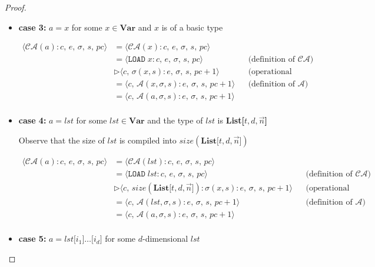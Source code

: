 \documentclass{article}
\begin{document}
\begin{proof}
\begin{itemize}
    \item \textbf{case 3: } $a = x$ for some $x \in \textbf{Var}$ and $x$ is of a basic type

    \[
      \begin{aligned}
        \langle  \mathcal{CA}(a) : c,\, e,\, \sigma,\, s,\, pc \rangle 
        &= \langle \mathcal{CA}(x) : c,\, e,\, \sigma,\, s,\, pc \rangle \\
        &= \langle \texttt{LOAD}\;x : c,\, e,\, \sigma,\, s,\, pc \rangle 
        && \text{(definition of $\mathcal{CA}$)} \\
        &\triangleright \langle c,\, \sigma(x, s) : e,\, \sigma,\, s,\, pc+1 \rangle 
        && \text{(operational semantics)} \\
        &= \langle c,\, \mathcal{A}(x, \sigma, s) : e,\, \sigma,\, s,\, pc+1 \rangle 
        && \text{(definition of $\mathcal{A}$)} \\
        &= \langle c,\, \mathcal{A}(a, \sigma, s) : e,\, \sigma,\, s,\, pc+1 \rangle \\
      \end{aligned}
  \]

  \item \textbf{case 4: } $a = lst$ for some $lst \in \textbf{Var}$ and the type of $lst$ is \textbf{List[$t, d, \vec{n}$]}

    Observe that the size of $lst$ is compiled into $size(\textbf{List[$t, d, \vec{n}$]})$

  \[
      \begin{aligned}
        \langle  \mathcal{CA}(a) : c,\, e,\, \sigma,\, s,\, pc \rangle 
        &= \langle \mathcal{CA}(lst) : c,\, e,\, \sigma,\, s,\, pc \rangle \\
        &= \langle \texttt{LOAD}\;lst : c,\, e,\, \sigma,\, s,\, pc \rangle 
        && \text{(definition of $\mathcal{CA}$)} \\
        &\triangleright \langle c,\, size(\textbf{List[$t, d, \vec{n}$]}) : \sigma(x, s) : e,\, \sigma,\, s,\, pc+1 \rangle 
        && \text{(operational semantics)} \\
        &= \langle c,\, \mathcal{A}(lst, \sigma, s) : e,\, \sigma,\, s,\, pc+1 \rangle 
        && \text{(definition of $\mathcal{A}$)} \\
        &= \langle c,\, \mathcal{A}(a, \sigma, s) : e,\, \sigma,\, s,\, pc+1 \rangle \\
      \end{aligned}
  \]

  \item \textbf{case 5: } $a = lst\texttt{[$i_1$]}\dots\texttt{[$i_d$]}$ for some $d$-dimensional $lst$


\end{itemize}
\end{proof}
\end{document}
